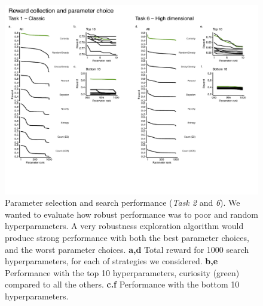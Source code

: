 \begin{figure}
	\begin{fullwidth}
	\includegraphics[width=0.8\linewidth]{img/robust.pdf} 
	\caption{Parameter selection and search performance (\textit{Task 2} and \textit{6}). We wanted to evaluate how robust performance was to poor and random hyperparameters. A very robustness exploration algorithm would produce strong performance with both the best parameter choices, and the worst parameter choices.   
	\textbf{a,d} Total reward for 1000 search hyperparameters, for each of strategies we considered.  
	\textbf{b,e} Performance with the top 10 hyperparameters, curiosity (green) compared to all the others.
	\textbf{c.f} Performance with the bottom 10 hyperparameters.
	}
\end{fullwidth}
\end{figure}
